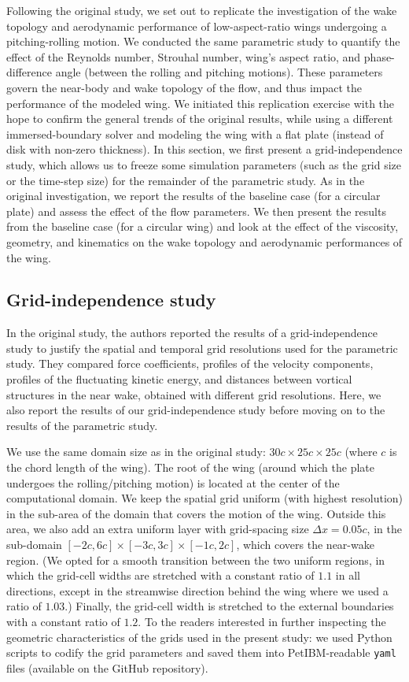 Following the original study, we set out to replicate the investigation of the wake topology and aerodynamic performance of low-aspect-ratio wings undergoing a pitching-rolling motion.
We conducted the same parametric study to quantify the effect of the Reynolds number, Strouhal number, wing's aspect ratio, and phase-difference angle (between the rolling and pitching motions).
These parameters govern the near-body and wake topology of the flow, and thus impact the performance of the modeled wing.
We initiated this replication exercise with the hope to confirm the general trends of the original results, while using a different immersed-boundary solver and modeling the wing with a flat plate (instead of disk with non-zero thickness).
In this section, we first present a grid-independence study, which allows us to freeze some simulation parameters (such as the grid size or the time-step size) for the remainder of the parametric study.
As in the original investigation, we report the results of the baseline case (for a circular plate) and assess the effect of the flow parameters.
We then present the results from the baseline case (for a circular wing) and look at the effect of the viscosity, geometry, and kinematics on the wake topology and aerodynamic performances of the wing.

\subsection{Grid-independence study}

In the original study, the authors reported the results of a grid-independence study to justify the spatial and temporal grid resolutions used for the parametric study.
They compared force coefficients, profiles of the velocity components, profiles of the fluctuating kinetic energy, and distances between vortical structures in the near wake, obtained with different grid resolutions.
Here, we also report the results of our grid-independence study before moving on to the results of the parametric study.

We use the same domain size as in the original study: $30c \times 25c \times 25c$ (where $c$ is the chord length of the wing).
The root of the wing (around which the plate undergoes the rolling/pitching motion) is located at the center of the computational domain.
We keep the spatial grid uniform (with highest resolution) in the sub-area of the domain that covers the motion of the wing.
Outside this area, we also add an extra uniform layer with grid-spacing size $\Delta x = 0.05c$, in the sub-domain $\left[ -2c, 6c \right] \times \left[ -3c, 3c \right] \times \left[ -1c, 2c \right]$, which covers the near-wake region.
(We opted for a smooth transition between the two uniform regions, in which the grid-cell widths are stretched with a constant ratio of $1.1$ in all directions, except in the streamwise direction behind the wing where we used a ratio of $1.03$.)
Finally, the grid-cell width is stretched to the external boundaries with a constant ratio of $1.2$.
To the readers interested in further inspecting the geometric characteristics of the grids used in the present study: we used Python scripts to codify the grid parameters and saved them into PetIBM-readable \texttt{yaml} files (available on the GitHub repository).


